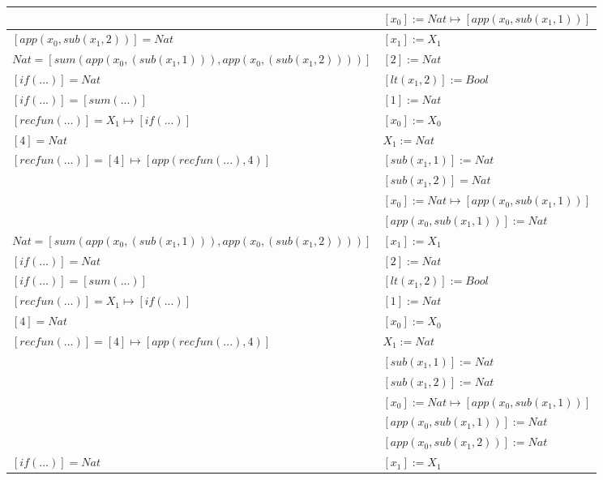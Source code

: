 \begin{exercise}
\begin{description}
\begin{center}
\begin{longtable}{ | l | l | }
                        & $[x_0] := Nat \mapsto [app(x_0, sub(x_1,1))]$ \\
                    \hline
                        $[app(x_0, sub(x_1,2))] = Nat$ & $[x_1] := X_1$ \\
                        $Nat = [sum(app(x_0, (sub(x_1,1))), app(x_0, (sub(x_1,2))))]$ & $[2] := Nat$ \\
                        $[if(...)] = Nat$ & $[lt(x_1 , 2)] := Bool$ \\
                        $[if(...)] = [sum(...)]$ & $[1] := Nat$ \\
                        $[recfun(...)] = X_1 \mapsto [if(...)]$ & $[x_0] := X_0$ \\
                        $[4] = Nat$ & $X_1 := Nat$ \\
                        $[recfun(...)] = [4] \mapsto [app(recfun(...), 4)]$ & $[sub(x_1,1)] := Nat$ \\
                        & $[sub(x_1,2)] = Nat$ \\
                        & $[x_0] := Nat \mapsto [app(x_0, sub(x_1,1))]$ \\
                        &  $[app(x_0, sub(x_1,1))] := Nat$\\
                    \hline
                        $Nat = [sum(app(x_0, (sub(x_1,1))), app(x_0, (sub(x_1,2))))]$ & $[x_1] := X_1$ \\
                        $[if(...)] = Nat$ & $[2] := Nat$ \\
                        $[if(...)] = [sum(...)]$ & $[lt(x_1 , 2)] := Bool$ \\
                        $[recfun(...)] = X_1 \mapsto [if(...)]$ & $[1] := Nat$ \\
                        $[4] = Nat$ & $[x_0] := X_0$ \\
                        $[recfun(...)] = [4] \mapsto [app(recfun(...), 4)]$ & $X_1 := Nat$ \\
                        & $[sub(x_1,1)] := Nat$ \\
                        & $[sub(x_1,2)] := Nat$ \\
                        & $[x_0] := Nat \mapsto [app(x_0, sub(x_1,1))]$ \\
                        & $[app(x_0, sub(x_1,1))] := Nat$ \\
                        & $[app(x_0, sub(x_1,2))] := Nat$ \\
                    \hline
                        $[if(...)] = Nat $ & $[x_1] := X_1$ \\

\end{longtable}
\end{center}
\end{description}
\end{exercise}
